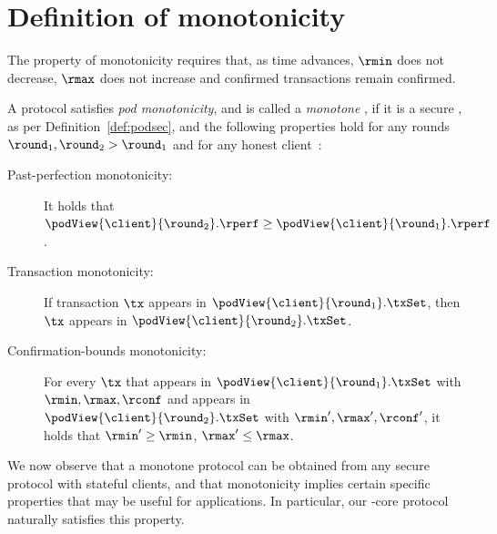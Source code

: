 \section{Definition of \podtm monotonicity}\label{app:monotonicity}

The property of \podtm monotonicity requires that, as time advances, $\rmin$ does not decrease, $\rmax$ does not increase and confirmed transactions remain confirmed.

\begin{definition}
	A \podtm protocol satisfies \emph{pod monotonicity}, and is called a \emph{monotone \podtm}, if it is a secure \podtm, as per Definition~\ref{def:podsec}, and the following properties hold for any rounds $\round_1,\round_2 > \round_1$ and for any honest client~\client:
	\begin{description}
		\item [Past-perfection monotonicity:] It holds that $\podView{\client}{\round_2}.\rperf \geq \podView{\client}{\round_1}.\rperf$.
		\item [Transaction monotonicity:] If  transaction $\tx$ appears in $\podView{\client}{\round_1}.\txSet$, then $\tx$ appears in $\podView{\client}{\round_2}.\txSet$.
		\item [Confirmation-bounds monotonicity:] For every $\tx$ that appears in $\podView{\client}{\round_1}.\txSet$ with $\rmin,\rmax,\rconf$ and appears in  $\podView{\client}{\round_2}.\txSet$ with $\rmin',\rmax',\rconf'$,  it holds that $\rmin'\geq \rmin$, $\rmax' \leq \rmax$.

	\end{description}
\end{definition}

We now observe that a monotone \podtm protocol can be obtained from any secure \podtm protocol with stateful clients, and that monotonicity implies certain specific properties that may be useful for applications. In particular, our \podtm-core protocol naturally satisfies this property.

